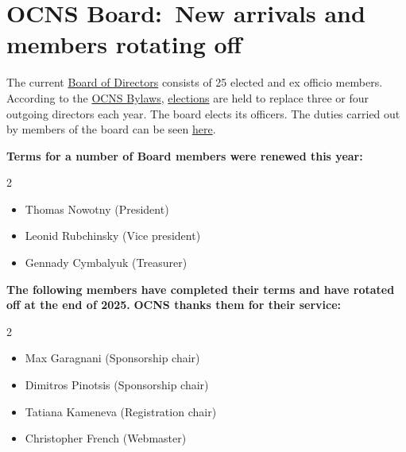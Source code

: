 \documentclass[11pt,a4paper,oneside]{article}
\begin{document}
\clearpage
\section*{OCNS Board:\ New arrivals and members rotating off}%
\sectionauthor{\vspace{-4ex}}


The current \href{https://www.cnsorg.org/board-of-directors}{Board of Directors} consists of 25 elected and ex officio members.
According to the \href{https://www.cnsorg.org/ocns-bylaws-2011}{OCNS Bylaws}, \href{https://www.cnsorg.org/election-procedures}{elections} are held to replace three or four outgoing directors each year.
The board elects its officers.
The duties carried out by members of the board can be seen \href{https://www.cnsorg.org/quick-director-duties}{here}.

\vspace{4ex}
\textbf{Terms for a number of Board members were renewed this year:}
\begin{multicols}{2}
  \begin{itemize}
    \item Thomas Nowotny (President)
    \item Leonid Rubchinsky (Vice president)
    \item Gennady Cymbalyuk (Treasurer)
  \end{itemize}
\end{multicols}

\textbf{The following members have completed their terms and have rotated off at the end of 2025.}
\textbf{OCNS thanks them for their service:}
\begin{multicols}{2}
  \begin{itemize}
    \item Max Garagnani (Sponsorship chair)
    \item Dimitros Pinotsis (Sponsorship chair)
    \item Tatiana Kameneva (Registration chair)
    \item Christopher French (Webmaster)
  \end{itemize}
\end{multicols}
\end{document}
